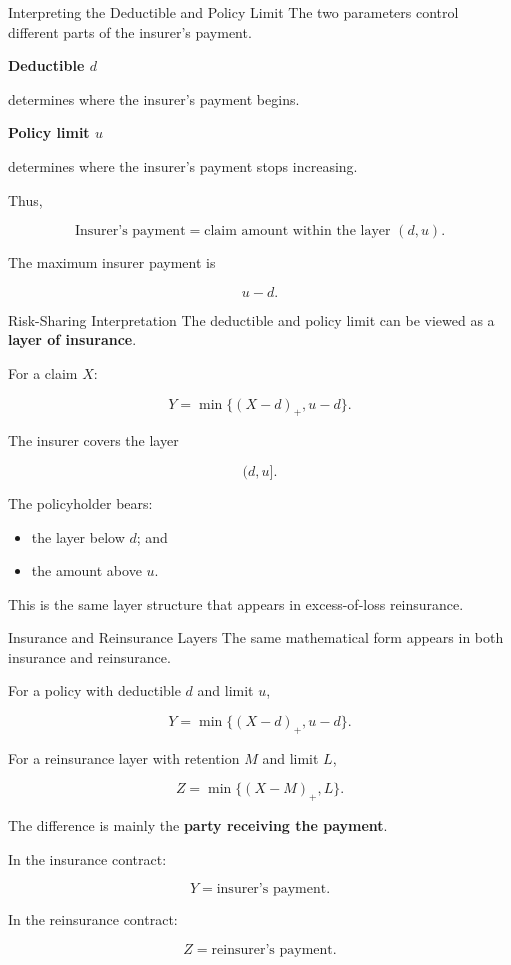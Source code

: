 \documentclass[
  ignorenonframetext,
  aspectratio=169,
]{beamer}
\providecommand{\tightlist}{%
  \setlength{\itemsep}{0pt}\setlength{\parskip}{0pt}}
\begin{document}
\begin{frame}{Interpreting the Deductible and Policy Limit}
\protect{}\label{interpreting-the-deductible-and-policy-limit}
The two parameters control different parts of the insurer's payment.

\textbf{Deductible \(d\)}

determines where the insurer's payment begins.

\textbf{Policy limit \(u\)}

determines where the insurer's payment stops increasing.

Thus,

\[
\boxed{
\text{Insurer's payment}
=
\text{claim amount within the layer }(d,u).
}
\]

The maximum insurer payment is

\[
u-d.
\]
\end{frame}

\begin{frame}{Risk-Sharing Interpretation}
\protect{}\label{risk-sharing-interpretation}
The deductible and policy limit can be viewed as a \textbf{layer of
insurance}.

For a claim \(X\):

\[
\boxed{
Y=\min\{(X-d)_+,u-d\}.
}
\]

The insurer covers the layer

\[
\boxed{(d,u]}.
\]

The policyholder bears:

\begin{itemize}
\tightlist
\item
  the layer below \(d\); and
\item
  the amount above \(u\).
\end{itemize}

This is the same layer structure that appears in excess-of-loss
reinsurance.
\end{frame}

\begin{frame}{Insurance and Reinsurance Layers}
\protect{}\label{insurance-and-reinsurance-layers}
The same mathematical form appears in both insurance and reinsurance.

For a policy with deductible \(d\) and limit \(u\),

\[
Y=\min\{(X-d)_+,u-d\}.
\]

For a reinsurance layer with retention \(M\) and limit \(L\),

\[
Z=\min\{(X-M)_+,L\}.
\]

The difference is mainly the \textbf{party receiving the payment}.

In the insurance contract:

\[
Y=\text{insurer's payment}.
\]

In the reinsurance contract:

\[
Z=\text{reinsurer's payment}.
\]
\end{frame}
\end{document}
